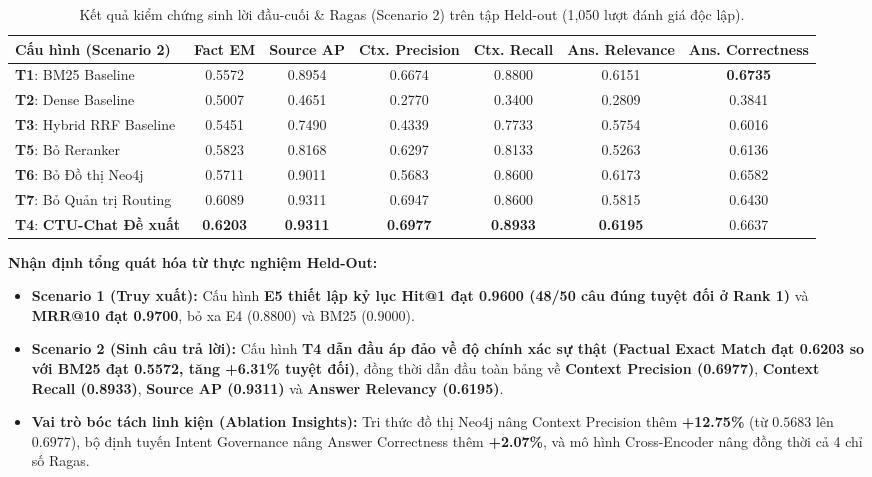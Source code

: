 \documentclass[a4paper,10pt]{article}
\begin{document}
\begin{table}[h!]
\centering
\small
\renewcommand{\arraystretch}{1.2}
\begin{tabularx}{\textwidth}{X c c c c c c}
\toprule
\rowcolor{tableheader}
\textbf{Cấu hình (Scenario 2)} & \textbf{Fact EM} & \textbf{Source AP} & \textbf{Ctx. Precision} & \textbf{Ctx. Recall} & \textbf{Ans. Relevance} & \textbf{Ans. Correctness} \\
\midrule
\textbf{T1}: BM25 Baseline & 0.5572 & 0.8954 & 0.6674 & 0.8800 & 0.6151 & \textbf{0.6735} \\
\textbf{T2}: Dense Baseline & 0.5007 & 0.4651 & 0.2770 & 0.3400 & 0.2809 & 0.3841 \\
\textbf{T3}: Hybrid RRF Baseline & 0.5451 & 0.7490 & 0.4339 & 0.7733 & 0.5754 & 0.6016 \\
\textbf{T5}: Bỏ Reranker & 0.5823 & 0.8168 & 0.6297 & 0.8133 & 0.5263 & 0.6136 \\
\textbf{T6}: Bỏ Đồ thị Neo4j & 0.5711 & 0.9011 & 0.5683 & 0.8600 & 0.6173 & 0.6582 \\
\textbf{T7}: Bỏ Quản trị Routing & 0.6089 & 0.9311 & 0.6947 & 0.8600 & 0.5815 & 0.6430 \\
\midrule
\rowcolor{successbg}
\textbf{T4}: \textbf{CTU-Chat Đề xuất} & \textbf{0.6203} & \textbf{0.9311} & \textbf{0.6977} & \textbf{0.8933} & \textbf{0.6195} & 0.6637 \\
\bottomrule
\end{tabularx}
\caption{Kết quả kiểm chứng sinh lời đầu-cuối \& Ragas (Scenario 2) trên tập Held-out (1,050 lượt đánh giá độc lập).}
\label{tab:heldout_scen2}
\end{table}

\textbf{Nhận định tổng quát hóa từ thực nghiệm Held-Out:}
\begin{itemize}[itemsep=1.5pt,leftmargin=1.5em]
    \item \textbf{Scenario 1 (Truy xuất):} Cấu hình \textbf{E5 thiết lập kỷ lục Hit@1 đạt 0.9600 (48/50 câu đúng tuyệt đối ở Rank 1)} và \textbf{MRR@10 đạt 0.9700}, bỏ xa E4 ($0.8800$) và BM25 ($0.9000$).
    \item \textbf{Scenario 2 (Sinh câu trả lời):} Cấu hình \textbf{T4 dẫn đầu áp đảo về độ chính xác sự thật (Factual Exact Match đạt 0.6203 so với BM25 đạt 0.5572, tăng +6.31\% tuyệt đối)}, đồng thời dẫn đầu toàn bảng về \textbf{Context Precision (0.6977)}, \textbf{Context Recall (0.8933)}, \textbf{Source AP (0.9311)} và \textbf{Answer Relevancy (0.6195)}.
    \item \textbf{Vai trò bóc tách linh kiện (Ablation Insights):} Tri thức đồ thị Neo4j nâng Context Precision thêm \textbf{+12.75\%} (từ $0.5683$ lên $0.6977$), bộ định tuyến Intent Governance nâng Answer Correctness thêm \textbf{+2.07\%}, và mô hình Cross-Encoder nâng đồng thời cả 4 chỉ số Ragas.
\end{itemize}
\end{document}
